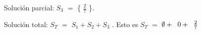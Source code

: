 \documentclass[12pt]{article}
\newenvironment{MyColorPar}[1]{%
    \leavevmode\color{#1}\ignorespaces%
}{%
}%
\begin{document}
\begin{MyColorPar}{verde_manzana}
Solución parcial: $S_{3}$ $=$ {\Large{\{ {\Large{${\frac{2}{7}}$}} \}}}. 
\end{MyColorPar} \vspace{0.5cm}

\begin{MyColorPar}{verde_manzana}
Solución total: $S_{T}$ $=$ $S_{1} + S_{2} + S_{3}$ . Esto es 
 $S_{T}$ $=$ $\emptyset + \hspace{0.2cm} {0} + \hspace{0.2cm} {\Large{\frac{2}{7}}}$ 

\end{MyColorPar} \vspace{0.5cm}

\end{document}
